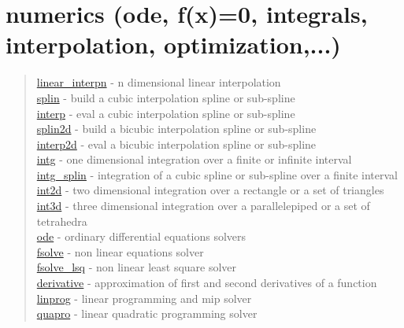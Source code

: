 \chapter*{numerics (ode, f(x)=0, integrals, interpolation,
  optimization,...)}


\begin{quote}
\noindent
\hyperlink{linear_interpn}{linear\_interpn} - n dimensional linear interpolation \\
\hyperlink{splin}{splin} - build a cubic interpolation spline or sub-spline \\
\hyperlink{interp}{interp} - eval a cubic interpolation spline or sub-spline \\
\hyperlink{splin2d}{splin2d} - build a bicubic interpolation spline or sub-spline \\
\hyperlink{interp2d}{interp2d} - eval a bicubic interpolation spline or sub-spline \\
\hyperlink{intg}{intg} - one dimensional integration over a finite or infinite interval \\
\hyperlink{intg_splin}{intg\_splin} - integration of a cubic spline or sub-spline over a finite interval \\
\hyperlink{int2d}{int2d} - two dimensional integration over a rectangle or a set of triangles \\
 \hyperlink{int3d}{int3d} - three dimensional integration over a parallelepiped  or a set of tetrahedra \\
\hyperlink{ode}{ode} - ordinary differential equations solvers \\
\hyperlink{fsolve}{fsolve} - non linear equations solver \\
\hyperlink{fsolve_lsq}{fsolve\_lsq} - non linear least square solver \\
\hyperlink{derivative}{derivative} - approximation of first and second derivatives of a function\\
\hyperlink{linprog}{linprog} - linear programming and mip solver\\
\hyperlink{quapro}{quapro} - linear quadratic programming solver \\
\end{quote}

















